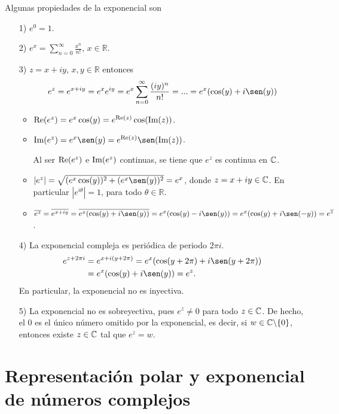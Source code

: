Algunas propiedades de la exponencial son
\begin{enumerate}
    \item[1)] $e^0 = 1$.
    \item[2)] $e^x = \sum_{n=0}^{\infty}{\frac{x^n}{n!}}$, $x \in \mathbb{R}$.
    \item[3)] $z = x +iy$, $x,y \in \mathbb{R}$ entonces
          \begin{align*}
              e^z = e^{x+iy} = e^{x}e^{iy} = e^{x}\sum_{n=0}^{\infty}{\frac{(iy)^n}{n!}} = ... = e^{x}(\cos(y) + i\sen(y))
          \end{align*}
          \begin{itemize}
              \item $\text{Re}(e^z) = e^x\cos(y) = e^{\text{Re}(z)}\cos(\text{Im}(z))$.
              \item $\im(e^z) = e^x\sen(y) = e^{\re(z)}\sen(\im(z))$.

                    Al ser $\text{Re}(e^z)$ e $\text{Im}(e^z)$ continuas, se tiene que $e^z$ es continua en $\mathbb{C}$.
              \item $|e^z| = \sqrt{(e^x\cos(y))^2 + (e^x\sen(y))^2} = e^x$, donde $z = x + iy \in \mathbb{C}$. En particular $|e^{i\theta}| = 1$, para todo $\theta \in \mathbb{R}$.
              \item $\overline{e^z} = \overline{e^{x +iy}} = \overline{e^x(\cos(y) + i\sen(y))} = e^x(\cos(y) - i\sen(y)) = e^x(\cos(y) + i\sen(-y)) = e^{\overline{z}}$.
          \end{itemize}
    \item[4)] La exponencial compleja es periódica de periodo $2\pi i$.
          \begin{align*}
              e^{z + 2\pi i} & = e^{x + i(y + 2\pi)} = e^x(\cos(y + 2\pi) + i\sen(y + 2\pi)) \\
                             & = e^x(\cos(y) + i\sen(y)) = e^z.
          \end{align*}
          En particular, la exponencial no es inyectiva.
    \item[5)] La exponencial no es sobreyectiva, pues $e^z \not = 0$ para todo $z \in \mathbb{C}$. De hecho, el $0$ es el único número omitido por la exponencial, es decir, si $w \in \mathbb{C} \backslash \{0\}$, entonces existe $z \in \mathbb{C}$ tal que $e^z = w$.
\end{enumerate}

\section{Representación polar y exponencial de números complejos}

